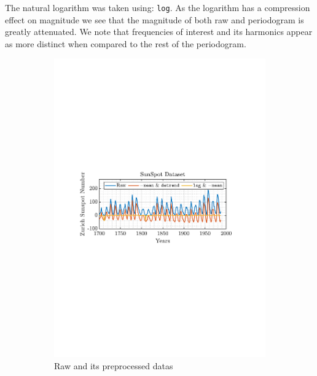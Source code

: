 \documentclass[12pt]{article}
\begin{document}
	The natural logarithm was taken using: \texttt{log}. As the logarithm has a compression effect on magnitude we see that the magnitude of both raw and periodogram is greatly attenuated. We note that frequencies of interest and its harmonics appear as more distinct when compared to the rest of the periodogram.

	\begin{figure}[H]
		\centering
		\begin{subfigure}{0.49\textwidth}
			\centering
			\includegraphics[trim={2.2cm 11.2cm 3.15cm  11.2cm}, clip, width=\textwidth]{../MATLAB/figures/q1_2a_fig01.pdf} 
			\captionsetup{justification=centering}
			\caption{Raw and its preprocessed datas}
		\end{subfigure}
		\begin{subfigure}{0.49\textwidth}
			\centering

\end{subfigure}
\end{figure}
\end{document}
